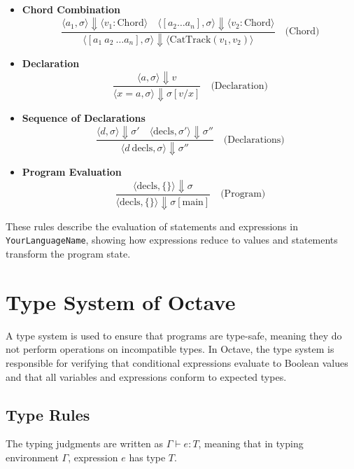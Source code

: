 \documentclass[letterpaper,12pt]{article}
\begin{document}
\begin{itemize}
    \item \textbf{Chord Combination}
    \[
    \frac{\langle a_1, \sigma \rangle \Downarrow \langle v_1 : \text{Chord} \rangle \quad \langle [a_2 \dots a_n], \sigma \rangle \Downarrow \langle v_2 : \text{Chord} \rangle}{\langle [a_1 \ a_2 \ \dots a_n], \sigma \rangle \Downarrow \langle \text{CatTrack}(v_1, v_2) \rangle} \quad \text{(Chord)}
    \]

    \item \textbf{Declaration}
    \[
    \frac{\langle a, \sigma \rangle \Downarrow v}{\langle x = a, \sigma \rangle \Downarrow \sigma[v/x]} \quad \text{(Declaration)}
    \]

    \item \textbf{Sequence of Declarations}
    \[
    \frac{\langle d, \sigma \rangle \Downarrow \sigma' \quad \langle \text{decls}, \sigma' \rangle \Downarrow \sigma''}{\langle d \ \text{decls}, \sigma \rangle \Downarrow \sigma''} \quad \text{(Declarations)}
    \]

    \item \textbf{Program Evaluation}
    \[
    \frac{\langle \text{decls}, \{\} \rangle \Downarrow \sigma}{\langle \text{decls}, \{\} \rangle \Downarrow \sigma[\text{main}]} \quad \text{(Program)}
    \]

\end{itemize}

These rules describe the evaluation of statements and expressions in \texttt{YourLanguageName}, showing how expressions reduce to values and statements transform the program state.

\section{Type System of Octave}

A type system is used to ensure that programs are type-safe,
 meaning they do not perform operations on incompatible types. 
 In Octave, the type system is responsible for verifying that conditional expressions evaluate to Boolean values and that all variables and expressions conform to expected types.

\subsection{Type Rules}

The typing judgments are written as \(\Gamma \vdash e : T\), meaning that in typing environment \(\Gamma\), expression \(e\) has type \(T\).
\end{document}
